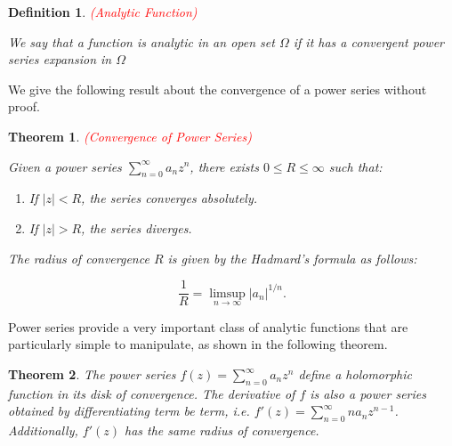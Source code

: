\documentclass{article}
\newtheorem{definition}{Definition}
\newtheorem{theorem}{Theorem}
\begin{document}
\begin{definition} \textcolor{red}{(Analytic Function)}

We say that a function is analytic in an open set $\Omega$ if it has a convergent power series expansion in $\Omega$
\end{definition}

We give the following result about the convergence of a power series without proof. 

\begin{theorem} \textcolor{red}{(Convergence of Power Series)}

Given a power series $\sum^\infty_{n=0}a_nz^n$, there exists $0\leq R\leq\infty$ such that:

\begin{enumerate}
\item
If $|z|<R$, the series converges absolutely.

\item
If $|z|>R$, the series diverges.
\end{enumerate}

The radius of convergence $R$ is given by the Hadmard's formula as follows:

\begin{equation}
\frac{1}{R}=\limsup_{n\rightarrow\infty}|a_n|^{1/n}.
\end{equation}
\end{theorem}

Power series provide a very important class of analytic functions that are particularly simple to manipulate, as shown in the following theorem. 

\begin{theorem}
The power series $f(z)=\sum^\infty_{n=0}a_nz^n$ define a holomorphic function in its disk of convergence. The derivative of $f$ is also a power series obtained by differentiating term be term, i.e. $f'(z)=\sum^\infty_{n=0}na_nz^{n-1}$. Additionally, $f'(z)$ has the same radius of convergence. 
\end{theorem}
\end{document}
